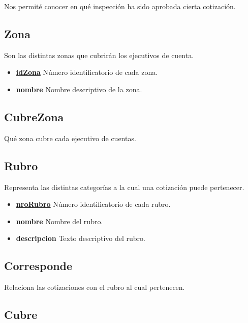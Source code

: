 \documentclass[a4paper,11pt]{article}
\begin{document}
Nos permité conocer en qué inspección ha sido aprobada cierta cotización.

\subsection{Zona}

Son las distintas zonas que cubrirán los ejecutivos de cuenta.

\begin{itemize}
   
  \item \textbf{\uline{idZona}} Número identificatorio de cada zona.
  
  \item \textbf{nombre} Nombre descriptivo de la zona.
  
\end{itemize}

\subsection{CubreZona}

Qué zona cubre cada ejecutivo de cuentas.

\subsection{Rubro}

Representa las distintas categorías a la cual una cotización puede pertenecer.

\begin{itemize}
   
  \item \textbf{\uline{nroRubro}} Número identificatorio de cada rubro.
  
  \item \textbf{nombre} Nombre del rubro.

  \item \textbf{descripcion} Texto descriptivo del rubro.
  
\end{itemize}

\subsection{Corresponde}

Relaciona las cotizaciones con el rubro al cual pertenecen.

\subsection{Cubre}
\end{document}
